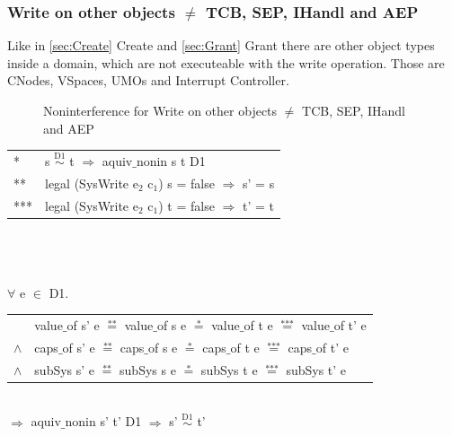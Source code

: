 \documentclass[pdftex,11pt,a4paper,twoside]{article}
\begin{document}
\subsubsection{Write on other objects $\neq$ TCB, SEP, IHandl and AEP}\label{WriteOthers}
Like in \ref{sec:Create} Create and \ref{sec:Grant} Grant there are other object types inside a domain, which are not executeable with the write operation. Those are CNodes, VSpaces, UMOs and Interrupt Controller. 
\begin{flushleft}
\begin{figure}[H]
\caption{Noninterference for Write on other objects $\neq$ TCB, SEP, IHandl and AEP}
\end{figure}
\end{flushleft}
\begin{tabular}{ll}
* & s $\overset{\text{D1}}{\sim}$ t $\Rightarrow$ aquiv$\_$nonin s t D1	\\ 
** & legal (SysWrite e$_2$ c$_1$) s = false $\Rightarrow$ s' = s \\ 
*** & legal (SysWrite e$_2$ c$_1$) t = false $\Rightarrow$ t' = t
\end{tabular} \\ \\ \\
$\forall$ e $\in$ D1. \\ 
\begin{tabular}{ll}
& value$\_$of s' e $\overset{\text{**}}{=}$ value$\_$of s e $\overset{\text{*}}{=}$ value$\_$of t e $\overset{\text{***}}{=}$ value$\_$of t' e \\
$\wedge$ & caps$\_$of s' e $\overset{\text{**}}{=}$ caps$\_$of s e $\overset{\text{*}}{=}$ caps$\_$of t e $\overset{\text{***}}{=}$ caps$\_$of t' e \\
$\wedge$ & subSys s' e $\overset{\text{**}}{=}$ subSys s e $\overset{\text{*}}{=}$ subSys t e $\overset{\text{***}}{=}$ subSys t' e
\end{tabular} \\
$\Rightarrow$ aquiv$\_$nonin s' t' D1 $\Rightarrow$ s' $\overset{\text{D1}}{\sim}$ t' 
\end{document}
